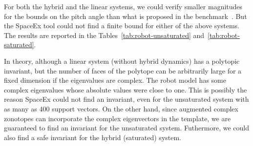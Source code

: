   For both the hybrid and the linear systems, we could
verify smaller magnitudes for the bounds on the pitch angle than what
is proposed in the benchmark~\cite{heinz2014benchmark}.  But the
SpaceEx tool could not find a finite bound for either of the above
systems.  The results are reported in the
Tables~\ref{tab:robot-unsaturated} and~\ref{tab:robot-saturated}.

  In theory, although a linear system (without hybrid
dynamics) has a polytopic invariant, but the number of faces of the
polytope can be arbitrarily large for a fixed dimension if the
eigenvalues are complex.  The robot model has some complex eigenvalues
whose absolute values were close to one.  This is possibly the reason
SpaceEx could not find an invariant, even for the unsaturated system
with as many as 400 support vectors.  On the other hand, since
augmented complex zonotopes can incorporate the complex eigenvectors
in the template, we are guaranteed to find an invariant for the
unsaturated system.  Futhermore, we could also find a safe
invariant for the hybrid (saturated) system.

